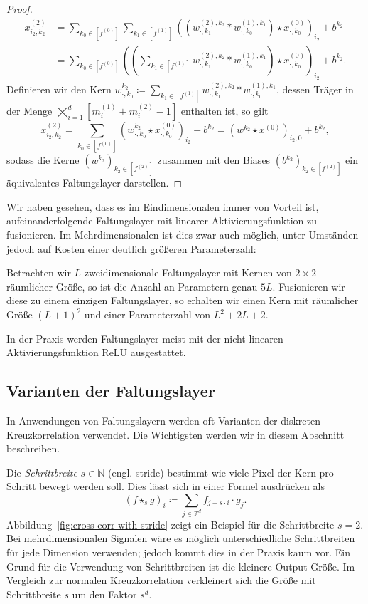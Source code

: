 \documentclass[paper=a4, 	%
		fontsize=11pt,
		abstract=true, 	%
		headsepline, 	%
		notitlepage	%
		]{scrartcl}
\theoremstyle{definition}
\newcommand{\Z}{\mathbb{Z}}
\newcommand{\N}{\mathbb{N}}
\newcommand{\bcdot}{\boldsymbol{\cdot}}
\newcommand{\fNat}[1]{[ #1 ]}
\begin{document}
\begin{proof}
\begin{align*}
        x^{(2)}_{i_2,k_2} 
        &= \sum_{k_0\in \fNat{f^{(0)}}}\sum_{k_1\in \fNat{f^{(1)}}}  \left( \left( w^{(2),k_2}_{\bcdot,k_1} * 
        w^{(1),k_1}_{\bcdot,k_0}\right) \star x^{(0)}_{\bcdot,k_0}
        \right)_{i_2} + b^{k_2} \\
        &= \sum_{k_0\in \fNat{f^{(0)}}} \left( \left(
            \sum_{k_1\in \fNat{f^{(1)}}}  w^{(2),k_2}_{\bcdot,k_1} * 
        w^{(1),k_1}_{\bcdot,k_0}\right) \star x^{(0)}_{\bcdot,k_0}
        \right)_{i_2} + b^{k_2}.
    \end{align*}
    Definieren wir den Kern $w^{k_2}_{\bcdot, k_0} \coloneqq \sum_{k_1\in \fNat{f^{(1)}}}  w^{(2),k_2}_{\bcdot,k_1} * 
    w^{(1),k_1}_{\bcdot,k_0}$, dessen Träger in der Menge $\bigtimes_{i=1}^d \fNat{m^{(1)}_i + m^{(2)}_i - 1}$ enthalten ist, so gilt
    \[
        x^{(2)}_{i_2, k_2}
        = \sum_{k_0\in \fNat{f^{(0)}}} \left( w^{k_2}_{\bcdot, k_0}\star x^{(0)}_{\bcdot,k_0}
        \right)_{i_2} + b^{k_2}
        = \left( w^{k_2} \star x^{(0)} \right)_{i_2, 0} + b^{k_2},
    \]
    sodass die Kerne $(w^{k_2})_{k_2\in\fNat{f^{(2)}}}$ zusammen mit den Biases $(b^{k_2})_{k_2\in\fNat{f^{(2)}}}$ ein äquivalentes Faltungslayer darstellen.
\end{proof}

Wir haben gesehen, dass es im Eindimensionalen immer von Vorteil ist, aufeinanderfolgende Faltungslayer mit linearer Aktivierungsfunktion zu fusionieren.
Im Mehrdimensionalen ist dies zwar auch möglich, unter Umständen jedoch auf Kosten einer deutlich größeren Parameterzahl:

Betrachten wir $L$ zweidimensionale Faltungslayer mit Kernen von $2\times 2$ räumlicher Größe, so ist die Anzahl an Parametern genau $5L$.
Fusionieren wir diese zu einem einzigen Faltungslayer, so erhalten wir einen Kern mit räumlicher Größe $(L+1)^2$ und einer Parameterzahl von $L^2 + 2L + 2$.

In der Praxis werden Faltungslayer meist mit der nicht-linearen Aktivierungsfunktion ReLU ausgestattet.

\subsection{Varianten der Faltungslayer}\label{subsec:variants-of-cross-corr}

In Anwendungen von Faltungslayern werden oft Varianten der diskreten Kreuzkorrelation verwendet.
Die Wichtigsten werden wir in diesem Abschnitt beschreiben.

Die \emph{Schrittbreite} $s\in\N$ (engl. \foreignlanguage{english}{stride}) bestimmt wie viele Pixel der Kern pro Schritt bewegt werden soll.
Dies lässt sich in einer Formel ausdrücken als 
\[
    \left( f \star_s g \right)_i \coloneqq \sum_{j\in \Z^d} f_{j - s\cdot i} \cdot g_j.
\]
Abbildung~\ref{fig:cross-corr-with-stride} zeigt ein Beispiel für die Schrittbreite $s=2$.
Bei mehrdimensionalen Signalen wäre es möglich unterschiedliche Schrittbreiten für jede Dimension verwenden; jedoch kommt dies in der Praxis kaum vor.
Ein Grund für die Verwendung von Schrittbreiten ist die kleinere Output-Größe.
Im Vergleich zur normalen Kreuzkorrelation verkleinert sich die Größe mit Schrittbreite $s$ um den Faktor $s^d$.
\end{document}
